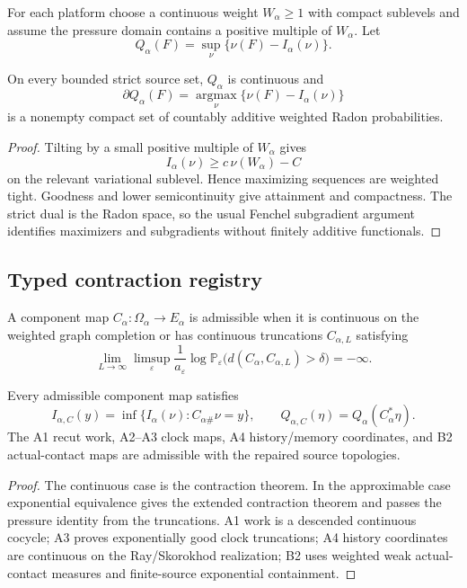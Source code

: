 For each platform choose a continuous weight \(W_\alpha\ge1\) with compact
sublevels and assume the pressure domain contains a positive multiple of
\(W_\alpha\).  Let
\[
 Q_\alpha(F)=\sup_\nu\{\nu(F)-I_\alpha(\nu)\}.
\]

\begin{proposition}
\label{prop:r5-c2-strict}
On every bounded strict source set,
\(Q_\alpha\) is continuous and
\[
 \partial Q_\alpha(F)
 =
 \operatorname*{argmax}_\nu
 \{\nu(F)-I_\alpha(\nu)\}
\]
is a nonempty compact set of countably additive weighted Radon probabilities.
\end{proposition}

\begin{proof}
Tilting by a small positive multiple of \(W_\alpha\) gives
\[
 I_\alpha(\nu)\ge c\,\nu(W_\alpha)-C
\]
on the relevant variational sublevel.  Hence maximizing sequences are
weighted tight.  Goodness and lower semicontinuity give attainment and
compactness.  The strict dual is the Radon space, so the usual Fenchel
subgradient argument identifies maximizers and subgradients without
finitely additive functionals.
\end{proof}

\subsection{Typed contraction registry}

A component map
\(C_\alpha:\Omega_\alpha\to E_\alpha\) is admissible when it is continuous
on the weighted graph completion or has continuous truncations
\(C_{\alpha,L}\) satisfying
\[
 \lim_{L\to\infty}\limsup_\varepsilon
 \frac1{a_\varepsilon}
 \log\mathbb P_\varepsilon
 \bigl(d(C_\alpha,C_{\alpha,L})>\delta\bigr)=-\infty.
\]

\begin{theorem}
\label{thm:r5-c2-contraction}
Every admissible component map satisfies
\[
 I_{\alpha,C}(y)
 =\inf\{I_\alpha(\nu):C_{\alpha\#}\nu=y\},
 \qquad
 Q_{\alpha,C}(\eta)=Q_\alpha(C_\alpha^*\eta).
\]
The A1 recut work, A2--A3 clock maps, A4 history/memory coordinates, and
B2 actual-contact maps are admissible with the repaired source topologies.
\end{theorem}

\begin{proof}
The continuous case is the contraction theorem.  In the approximable case
exponential equivalence gives the extended contraction theorem and passes
the pressure identity from the truncations.  A1 work is a descended continuous
cocycle; A3 proves exponentially good clock truncations; A4 history
coordinates are continuous on the Ray/Skorokhod realization; B2 uses weighted
weak actual-contact measures and finite-source exponential containment.
\end{proof}

